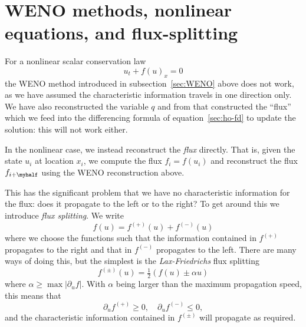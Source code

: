 
\section{WENO methods, nonlinear equations, and flux-splitting}
\label{sec:weno-burgers-fvs}


For a nonlinear scalar conservation law
\begin{equation}
  \label{eq:scalar_conslaw}
  u_t + f(u)_x = 0
\end{equation}
the WENO method introduced in subsection~\ref{sec:WENO} above does not work,
as we have assumed the characteristic
information travels in one direction only. We have also reconstructed the
variable $q$ and from that constructed the ``flux'' which we feed into the
differencing formula of equation~\eqref{sec:ho-fd} to update the solution: this
will not work either.

In the nonlinear case, we instead reconstruct the \emph{flux} directly. That
is, given the state $u_i$ at location $x_i$, we compute the flux $f_i = f(u_i)$
and reconstruct the flux $f_{i+\myhalf}$ using the WENO reconstruction above.

This has the significant problem that we have no characteristic information for
the flux: does it propagate to the left or to the right? To get around this we
introduce \emph{flux splitting}. We write
\begin{equation}
  \label{eq:flux-splitting}
  f(u) = f^{(+)}(u) + f^{(-)}(u)
\end{equation}
where we choose the functions such that the information contained in $f^{(+)}$
propagates to the right and that in $f^{(-)}$ propagates to the left. There are
many ways of doing this, but the simplest is the \emph{Lax-Friedrichs} flux
splitting
\begin{equation}
  \label{eq:lf-flux-split}
  f^{(\pm)}(u) = \tfrac{1}{2} \left( f(u) \pm \alpha u \right)
\end{equation}
where $\alpha \ge \max | \partial_u f |$. With $\alpha$ being larger than the maximum propagation speed, this means that
\begin{equation}
  \label{eq:lf-flux-split-speeds}
  \partial_u f^{(+)} \ge 0, \quad \partial_u f^{(-)} \le 0,
\end{equation}
and the characteristic information contained in $f^{(\pm)}$ will propagate as required.

